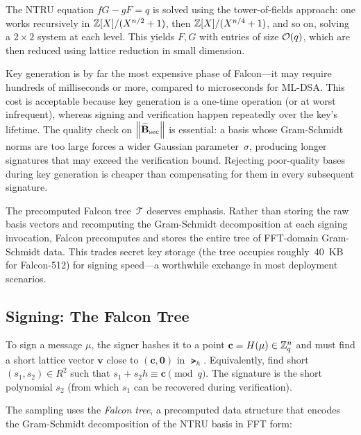 The NTRU equation $fG - gF = q$ is solved using the tower-of-fields approach: one works recursively in $\mathbb{Z}[X]/(X^{n/2}+1)$, then $\mathbb{Z}[X]/(X^{n/4}+1)$, and so on, solving a $2 \times 2$ system at each level.  This yields $F, G$ with entries of size $\mathcal{O}(q)$, which are then reduced using lattice reduction in small dimension.

Key generation is by far the most expensive phase of Falcon---it may require hundreds of milliseconds or more, compared to microseconds for ML-DSA.  This cost is acceptable because key generation is a one-time operation (or at worst infrequent), whereas signing and verification happen repeatedly over the key's lifetime.  The quality check on $\left\lVert \widetilde{\mathbf{B}}_{\mathrm{sec}} \right\rVert$ is essential: a basis whose Gram-Schmidt norms are too large forces a wider Gaussian parameter~$\sigma$, producing longer signatures that may exceed the verification bound.  Rejecting poor-quality bases during key generation is cheaper than compensating for them in every subsequent signature.

The precomputed Falcon tree~$\mathcal{T}$ deserves emphasis.  Rather than storing the raw basis vectors and recomputing the Gram-Schmidt decomposition at each signing invocation, Falcon precomputes and stores the entire tree of FFT-domain Gram-Schmidt data.  This trades secret key storage (the tree occupies roughly~40~KB for Falcon-512) for signing speed---a worthwhile exchange in most deployment scenarios.

\subsection{Signing: The Falcon Tree}
\label{subsec:falcon-sign}

To sign a message $\mu$, the signer hashes it to a point $\mathbf{c} = H(\mu) \in \mathbb{Z}_q^n$ and must find a short lattice vector $\mathbf{v}$ close to $(\mathbf{c}, \mathbf{0})$ in $\lat_h$.  Equivalently, find short $(s_1, s_2) \in R^2$ such that $s_1 + s_2 h \equiv \mathbf{c} \pmod{q}$.  The signature is the short polynomial $s_2$ (from which $s_1$ can be recovered during verification).

The sampling uses the \emph{Falcon tree}, a precomputed data structure that encodes the Gram-Schmidt decomposition of the NTRU basis in FFT form:

